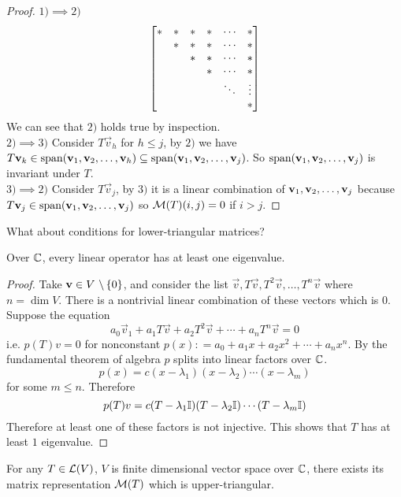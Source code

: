 \newpage
\begin{proof}
    $1) \implies 2) $ \[\begin{bmatrix} * & * & * & * & \cdots & * \\  & * & * & * & \cdots & * \\  &  & * & * & \cdots & * \\ & & & * & \cdots & * \\  & & & & \ddots & \vdots \\  & & & & & * \end{bmatrix}\] We can see that $2)$ holds true by inspection. \\
    $2) \implies 3)$ Consider $T\vec v_h$ for $h \leq j$, by $2)$ we have $T\mathbf v_k \in \text{span}({\mathbf v}_1,{\mathbf v}_2, \ldots, {\mathbf v}_{h}) \subseteq \text{span} ({\mathbf v}_1,{\mathbf v}_2, \ldots, {\mathbf v}_{j})$. So $\text{span} ({\mathbf v}_1,{\mathbf v}_2, \ldots, {\mathbf v}_{j})$ is invariant under $T$. \\
    $3) \implies 2)$ Consider $T\vec v_j$, by $3)$ it is a linear combination of ${\mathbf v}_1,{\mathbf v}_2, \ldots, {\mathbf v}_{j}$ because $T\mathbf v_j \in \text{span}({\mathbf v}_1,{\mathbf v}_2, \ldots, {\mathbf v}_{j})$ so $\mathcal M(T)(i,j) = 0$ if $i > j$.
\end{proof}
\begin{question}
    What about conditions for lower-triangular matrices?
\end{question}
\begin{lemma}
Over $\mathbb C$, every linear operator has at least one eigenvalue.
\end{lemma}
\begin{proof}
    Take $\vec v \in V\ \backslash \lb 0 \rb$, and consider the list $\vec v, T\vec v, T^2\vec v, \ldots, T^n\vec v$ where $n = \dim V$. There is a nontrivial linear combination of these vectors which is $0$. Suppose the equation \[a_0\vec v_1 + a_1T\vec v + a_2T^2\vec v + \cdots + a_nT^n\vec v = 0\]
    i.e. $p(T)v = 0$ for nonconstant $p(x) : = a_0 + a_1x + a_2x^2 + \cdots + a_nx^n$. By the fundamental theorem of algebra $p$ splits into linear factors over $\mathbb C$.
    \[ p(x) = c(x - \lambda_1)(x - \lambda_2) \cdots (x - \lambda_m)\] for some $m \leq n$. Therefore 
    \[ p(T)v = c(T - \lambda_1 \mathbb I)(T - \lambda_2  \mathbb I) \cdots (T - \lambda_m \mathbb I)\]
    Therefore at least one of these factors is not injective. This shows that $T$ has at least $1$ eigenvalue.
\end{proof}
\begin{theorem}
    For any $T \in \mathcal L(V)$, $V$ is finite dimensional vector space over $\mathbb C$, there exists its matrix representation $\mathcal M(T)$ which is upper-triangular.
\end{theorem}
\newpage
